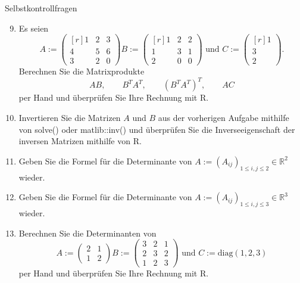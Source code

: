 \documentclass[
  8pt,
  ignorenonframetext,
]{beamer}
\begin{document}
\begin{frame}{Selbstkontrollfragen}
\protect\hypertarget{selbstkontrollfragen-1}{}
\footnotesize
\begin{enumerate}
\setcounter{enumi}{8}
\item Es seien
\begin{equation}
A :=
\begin{pmatrix*}[r]
1 & 2 & 3 \\
4 & 5 & 6 \\
3 & 2 & 0
\end{pmatrix*}
B :=
\begin{pmatrix*}[r]
1 & 2 & 2 \\
1 & 3 & 1 \\
2 & 0 & 0
\end{pmatrix*}
\mbox{ und }
C :=
\begin{pmatrix*}[r]
1 \\ 3 \\ 2
\end{pmatrix*}.
\end{equation}
Berechnen Sie die Matrixprodukte
\begin{equation}
AB , \quad\quad
B^TA^T, \quad\quad
\left(B^TA^T\right)^T, \quad\quad
AC
\end{equation}
per Hand und überprüfen Sie Ihre Rechnung mit R.



\item Invertieren Sie die Matrizen $A$ und $B$ aus der vorherigen Aufgabe mithilfe
von solve() oder matlib::inv()  und überprüfen Sie die Inverseeigenschaft der 
inversen Matrizen mithilfe von R.



\item Geben Sie die Formel für die Determinante von $A := (A_{ij})_{1 \le i,j \le 2} \in \mathbb{R}^2$ wieder.
\item Geben Sie die Formel für die Determinante von $A := (A_{ij})_{1 \le i,j \le 3} \in \mathbb{R}^3$ wieder.
\item Berechnen Sie die Determinanten von
\begin{equation}
A := \begin{pmatrix} 2 & 1 \\ 1 & 2 \end{pmatrix}
B := \begin{pmatrix} 3 & 2 & 1 \\ 2 & 3 & 2 \\ 1 & 2 & 3 \end{pmatrix} \mbox{ und }
C := \mbox{diag}(1,2,3)
\end{equation}
per Hand und überprüfen Sie Ihre Rechnung mit R.
\end{enumerate}
\end{frame}
\end{document}
